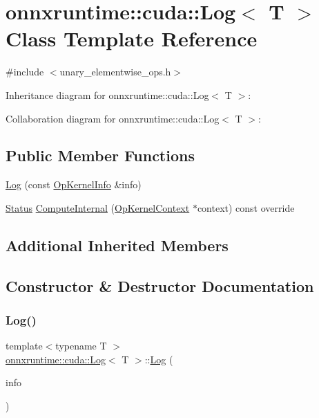 \hypertarget{classonnxruntime_1_1cuda_1_1Log}{}\section{onnxruntime\+:\+:cuda\+:\+:Log$<$ T $>$ Class Template Reference}
\label{classonnxruntime_1_1cuda_1_1Log}


{\ttfamily \#include $<$unary\+\_\+elementwise\+\_\+ops.\+h$>$}



Inheritance diagram for onnxruntime\+:\+:cuda\+:\+:Log$<$ T $>$\+:


Collaboration diagram for onnxruntime\+:\+:cuda\+:\+:Log$<$ T $>$\+:
\subsection*{Public Member Functions}
\begin{DoxyCompactItemize}
\item 
\mbox{\hyperlink{classonnxruntime_1_1cuda_1_1Log_a5da66694a40cb7e3ec36711956c21e67}{Log}} (const \mbox{\hyperlink{classonnxruntime_1_1OpKernelInfo}{Op\+Kernel\+Info}} \&info)
\item 
\mbox{\hyperlink{classonnxruntime_1_1common_1_1Status}{Status}} \mbox{\hyperlink{classonnxruntime_1_1cuda_1_1Log_a857314aeb210d599f086e8109e6324d4}{Compute\+Internal}} (\mbox{\hyperlink{classonnxruntime_1_1OpKernelContext}{Op\+Kernel\+Context}} $\ast$context) const override
\end{DoxyCompactItemize}
\subsection*{Additional Inherited Members}


\subsection{Constructor \& Destructor Documentation}
\mbox{\label{classonnxruntime_1_1cuda_1_1Log_a5da66694a40cb7e3ec36711956c21e67}} 
\subsubsection{\texorpdfstring{Log()}{Log()}}
{\footnotesize\ttfamily template$<$typename T $>$ \\
\mbox{\hyperlink{classonnxruntime_1_1cuda_1_1Log}{onnxruntime\+::cuda\+::\+Log}}$<$ T $>$\+::\mbox{\hyperlink{classonnxruntime_1_1cuda_1_1Log}{Log}} (\begin{DoxyParamCaption}\item[{const \mbox{\hyperlink{classonnxruntime_1_1OpKernelInfo}{Op\+Kernel\+Info}} \&}]{info }\end{DoxyParamCaption})\hspace{0.3cm}{\ttfamily [inline]}}



